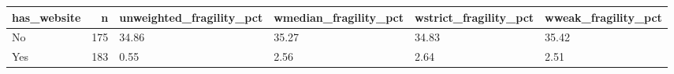 \begin{tabular}{lrllll}
\toprule
has\_website & n & unweighted\_fragility\_pct & wmedian\_fragility\_pct & wstrict\_fragility\_pct & wweak\_fragility\_pct \\
\midrule
No & 175 & 34.86 & 35.27 & 34.83 & 35.42 \\
Yes & 183 & 0.55 & 2.56 & 2.64 & 2.51 \\
\bottomrule
\end{tabular}
